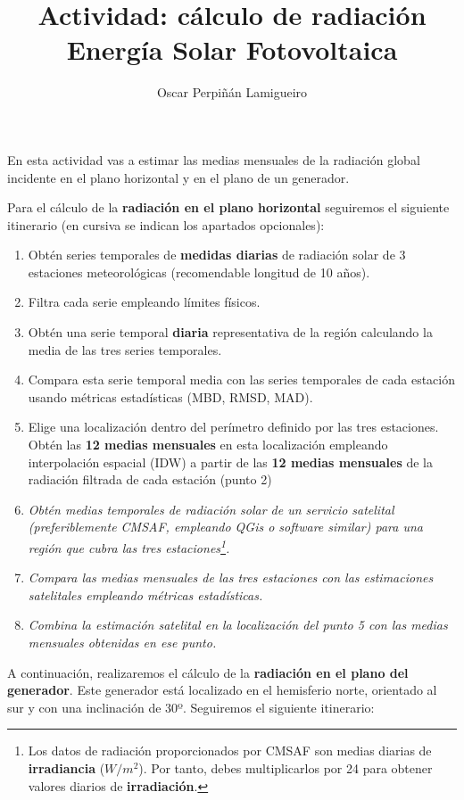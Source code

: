 \documentclass[11pt]{article}
\author{Oscar Perpiñán Lamigueiro}
\date{}
\title{Actividad: cálculo de radiación\\\medskip
\large Energía Solar Fotovoltaica}
\begin{document}
\maketitle
En esta actividad vas a estimar las medias mensuales de la radiación global incidente en el plano horizontal y en el plano de un generador.

Para el cálculo de la \textbf{radiación en el plano horizontal} seguiremos el siguiente itinerario (en cursiva se indican los apartados opcionales):

\begin{enumerate}
\item Obtén series temporales de \textbf{medidas diarias} de radiación solar de 3 estaciones meteorológicas (recomendable longitud de 10 años).
\item Filtra cada serie empleando límites físicos.
\item Obtén una serie temporal \textbf{diaria} representativa de la región calculando la media de las tres series temporales.
\item Compara esta serie temporal media con las series temporales de cada estación usando métricas estadísticas (MBD, RMSD, MAD).
\item Elige una localización dentro del perímetro definido por las tres estaciones. Obtén las \textbf{12 medias mensuales} en esta localización empleando interpolación espacial (IDW) a partir de las \textbf{12 medias mensuales} de la radiación filtrada de cada estación (punto 2)
\item \emph{Obtén medias temporales de radiación solar de un servicio satelital (preferiblemente CMSAF,  empleando QGis o software similar) para una región que cubra las tres estaciones\footnote{Los datos de radiación proporcionados por CMSAF son medias diarias de \textbf{irradiancia} (\(W/m^2\)). Por tanto, debes multiplicarlos por 24 para obtener valores diarios de \textbf{irradiación}.}.}
\item \emph{Compara las medias mensuales de las tres estaciones con las estimaciones satelitales empleando métricas estadísticas.}
\item \emph{Combina la estimación satelital en la localización del punto 5 con las medias mensuales obtenidas en ese punto.}
\end{enumerate}

A continuación, realizaremos el cálculo de la \textbf{radiación en el plano del generador}. Este generador está localizado en el hemisferio norte, orientado al sur y con una inclinación de 30º. Seguiremos el siguiente itinerario:
\end{document}
